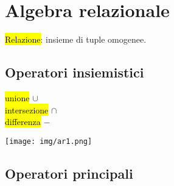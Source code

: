 \documentclass[a4paper]{article}
\begin{document}
\section{Algebra relazionale}
\hl{Relazione}: insieme di tuple omogenee.\par \subsection{Operatori insiemistici}
\hl{unione} $\cup$ \\
\hl{intersezione} $\cap$\\
\hl{differenza} $-$
\begin{center}
      \texttt{[image: img/ar1.png]}
\end{center}\par \subsection{Operatori principali}
\end{document}
